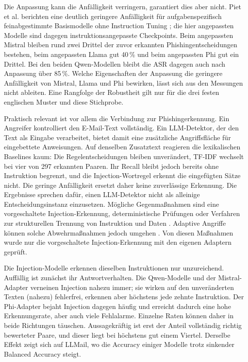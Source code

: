 \documentclass[12pt,twoside=false,a4paper,parskip]{scrbook}
\begin{document}
Die Anpassung kann die Anfälligkeit verringern, garantiert dies aber nicht. Piet et al. berichten eine deutlich geringere Anfälligkeit für aufgabenspezifisch feinabgestimmte Basismodelle ohne Instruction Tuning \cite{piet2023jatmo}; die hier angepassten Modelle sind dagegen instruktionsangepasste Checkpoints. Beim angepassten Mistral bleiben rund zwei Drittel der zuvor erkannten Phishingentscheidungen bestehen, beim angepassten Llama gut 40\,\% und beim angepassten Phi gut ein Drittel. Bei den beiden Qwen-Modellen bleibt die ASR dagegen auch nach Anpassung über 85\,\%. Welche Eigenschaften der Anpassung die geringere Anfälligkeit von Mistral, Llama und Phi bewirken, lässt sich aus den Messungen nicht ableiten. Eine Rangfolge der Robustheit gilt nur für die drei festen englischen Muster und diese Stichprobe.

Praktisch relevant ist vor allem die Verbindung zur Phishingerkennung. Ein Angreifer kontrolliert den E-Mail-Text vollständig. Ein LLM-Detektor, der den Text als Eingabe verarbeitet, bietet damit eine zusätzliche Angriffsfläche für eingebettete Anweisungen. Auf denselben Zusatztext reagieren die lexikalischen Baselines kaum: Die Regelentscheidungen bleiben unverändert, TF-IDF wechselt bei vier von 297 erkannten Paaren. Ihr Recall bleibt jedoch bereits ohne Instruktion begrenzt, und die Injection-Wortregel erkennt die eingefügten Sätze nicht. Die geringe Anfälligkeit ersetzt daher keine zuverlässige Erkennung. Die Ergebnisse sprechen dafür, einen LLM-Detektor nicht als alleinige Entscheidungsinstanz einzusetzen. Mögliche Gegenmaßnahmen sind eine vorgeschaltete Injection-Erkennung, deterministische Prüfungen oder Verfahren zur strukturellen Trennung von Instruktion und Daten \cite{liu2024formalizing,chen2025struq,hines2024spotlighting,wallace2024hierarchy}. Adaptive Angriffe können solche Abwehrmaßnahmen jedoch umgehen \cite{nasr2025attacker}. Von diesen Maßnahmen wurde nur die vorgeschaltete Injection-Erkennung mit den eigenen Adaptern geprüft.

Die Injection-Modelle erkennen dieselben Instruktionen nur unzureichend. Auffällig ist zunächst ihr Antwortverhalten. Die Qwen-Modelle und der Mistral-Adapter verneinen Injection nahezu immer; sie wirken auf den unveränderten Texten (nahezu) fehlerfrei, erkennen aber höchstens jede zehnte Instruktion. Der Phi-Adapter bejaht Injection dagegen häufig und erreicht dadurch eine hohe Erkennungsrate, aber auch viele Fehlalarme. Einzelne Raten können daher in beide Richtungen täuschen. Aussagekräftig ist erst der Anteil vollständig richtig bewerteter Paare, und dieser liegt bei höchstens gut einem Viertel. Derselbe Effekt zeigt sich auf LLMail, wo die Accuracy einiger Modelle trotz sinkender Balanced Accuracy steigt.
\end{document}
